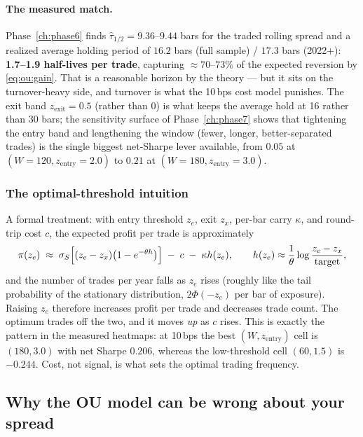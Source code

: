 \paragraph{The measured match.} Phase~\ref{ch:phase6} finds
$\hat\tau_{1/2}=9.36$--$9.44$ bars for the traded rolling spread and a realized average
holding period of $16.2$ bars (full sample) / $17.3$ bars (2022+): \textbf{1.7--1.9
half-lives per trade}, capturing $\approx70$--$73\%$ of the expected reversion by
\eqref{eq:ou:gain}. That is a reasonable horizon by the theory --- but it sits on the
turnover-heavy side, and turnover is what the 10\,bps cost model punishes. The exit band
$z_{\text{exit}}=0.5$ (rather than 0) is what keeps the average hold at 16 rather than 30
bars; the sensitivity surface of Phase~\ref{ch:phase7} shows that tightening the entry
band and lengthening the window (fewer, longer, better-separated trades) is the single
biggest net-Sharpe lever available, from $0.05$ at $(W{=}120, z_{\text{entry}}{=}2.0)$ to
$0.21$ at $(W{=}180, z_{\text{entry}}{=}3.0)$.

\subsubsection{The optimal-threshold intuition}

A formal treatment: with entry threshold $z_e$, exit $z_x$, per-bar carry $\kappa$, and
round-trip cost $c$, the expected profit per trade is approximately
\begin{equation}
  \pi(z_e) \;\approx\; \sigma_S\Bigl[(z_e-z_x)\bigl(1-e^{-\theta h}\bigr)\Bigr]
  \;-\; c\;-\;\kappa h(z_e),
  \qquad
  h(z_e)\approx \frac{1}{\theta}\log\frac{z_e-z_x}{\text{target}},
  \label{eq:ou:profit}
\end{equation}
and the number of trades per year falls as $z_e$ rises (roughly like the tail probability
of the stationary distribution, $2\Phi(-z_e)$ per bar of exposure). Raising $z_e$
therefore increases profit per trade and decreases trade count. The optimum trades off
the two, and it moves \emph{up} as $c$ rises. This is exactly the pattern in the
measured heatmaps: at 10\,bps the best $(W,z_{\text{entry}})$ cell is
$(180, 3.0)$ with net Sharpe $0.206$, whereas the low-threshold cell $(60,1.5)$ is
$-0.244$. Cost, not signal, is what sets the optimal trading frequency.

\subsection{Why the OU model can be wrong about your spread}
\label{sec:ou:caveats}

